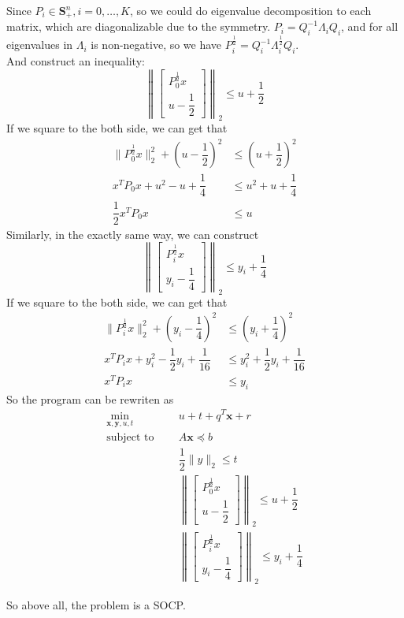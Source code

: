Since $P_i \in \mathbf{S}_{+}^n, i=0, \ldots, K$, so we could do eigenvalue decomposition to each matrix, which are diagonalizable due to the symmetry.
$P_i=Q_i^{-1}\Lambda_iQ_i$, and for all eigenvalues in $\Lambda_i$ is non-negative, so we have $P_i^{\frac{1}{2}}=Q_i^{-1}\Lambda_i^{\frac{1}{2}}Q_i$.\\
And construct an inequality:
$$\left\|
\left[\begin{array}{l}
P_0^{\frac{1}{2}}x \\
u-\dfrac{1}{2}
\end{array}\right]\right\|_2
\leq
u+\dfrac{1}{2}
$$
If we square to the both side, we can get that
\begin{align*}
    \|P_0^{\frac{1}{2}}x\|_2^2+(u-\dfrac{1}{2})^2 &\leq (u+\dfrac{1}{2})^2\\
    x^TP_0x+u^2-u+\dfrac{1}{4} &\leq u^2+u+\dfrac{1}{4} \\
    \dfrac{1}{2}x^TP_0x &\leq u
\end{align*}
Similarly, in the exactly same way, we can construct
$$\left\|
\left[\begin{array}{l}
P_i^{\frac{1}{2}}x \\
y_i-\dfrac{1}{4}
\end{array}\right]\right\|_2
\leq
y_i+\dfrac{1}{4}
$$
If we square to the both side, we can get that
\begin{align*}
    \|P_i^{\frac{1}{2}}x\|_2^2+(y_i-\dfrac{1}{4})^2 &\leq (y_i+\dfrac{1}{4})^2\\
    x^TP_ix+y_i^2-\dfrac{1}{2}y_i+\dfrac{1}{16} &\leq y_i^2+\dfrac{1}{2}y_i+\dfrac{1}{16} \\
    x^TP_ix &\leq y_i
\end{align*}
So the program can be rewriten as
\begin{align*}
    \min_{\mathbf{x},\mathbf{y},u,t}\ \ \ \ \ & u+t+q^T \mathbf{x}+r \\
    \text {subject to }\ \ \ \ \ & A \mathbf{x} \preceq b \\
    & \dfrac{1}{2}\|y\|_2 \leq t \\
    & \left\|
    \left[\begin{array}{l}
    P_0^{\frac{1}{2}}x \\
    u-\dfrac{1}{2}
    \end{array}\right]\right\|_2
    \leq
    u+\dfrac{1}{2} \\
    & \left\|
    \left[\begin{array}{l}
    P_i^{\frac{1}{2}}x \\
    y_i-\dfrac{1}{4}
    \end{array}\right]\right\|_2
    \leq
    y_i+\dfrac{1}{4}
\end{align*}

So above all, the problem is a SOCP.\\

\newpage
